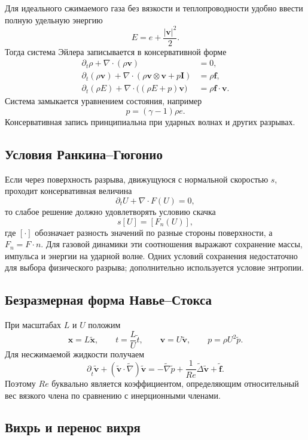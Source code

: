 Для идеального сжимаемого газа без вязкости и теплопроводности удобно ввести
полную удельную энергию
\[
    E=e+\frac{|\mathbf v|^2}{2}.
\]
Тогда система Эйлера записывается в консервативной форме
\[
\boxed{
\begin{aligned}
\partial_t\rho+\nabla\cdot(\rho\mathbf v)&=0,\\
\partial_t(\rho\mathbf v)
+\nabla\cdot(\rho\mathbf v\otimes\mathbf v+p\mathbf I)&=\rho\mathbf f,\\
\partial_t(\rho E)
+\nabla\cdot\bigl((\rho E+p)\mathbf v\bigr)&=\rho\mathbf f\cdot\mathbf v.
\end{aligned}}
\]
Система замыкается уравнением состояния, например
\[
    p=(\gamma-1)\rho e.
\]
Консервативная запись принципиальна при ударных волнах и других разрывах.

\subsection{Условия Ранкина--Гюгонио}

Если через поверхность разрыва, движущуюся с нормальной скоростью $s$, проходит
консервативная величина
\[
    \partial_t U+\nabla\cdot F(U)=0,
\]
то слабое решение должно удовлетворять условию скачка
\[
    \boxed{s[U]=[F_n(U)]},
\]
где $[\cdot]$ обозначает разность значений по разные стороны поверхности, а
$F_n=F\cdot n$. Для газовой динамики эти соотношения выражают сохранение массы,
импульса и энергии на ударной волне. Одних условий сохранения недостаточно для
выбора физического разрыва; дополнительно используется условие энтропии.

\subsection{Безразмерная форма Навье--Стокса}

При масштабах $L$ и $U$ положим
\[
    \mathbf x=L\widetilde{\mathbf x},
    \qquad
    t=\frac{L}{U}\widetilde t,
    \qquad
    \mathbf v=U\widetilde{\mathbf v},
    \qquad
    p=\rho U^2\widetilde p.
\]
Для несжимаемой жидкости получаем
\[
    \boxed{
    \partial_{\widetilde t}\widetilde{\mathbf v}
    +(\widetilde{\mathbf v}\cdot\widetilde\nabla)\widetilde{\mathbf v}
    =-\widetilde\nabla\widetilde p
    +\frac1{Re}\widetilde\Delta\widetilde{\mathbf v}
    +\widetilde{\mathbf f}.
    }
\]
Поэтому $Re$ буквально является коэффициентом, определяющим относительный вес
вязкого члена по сравнению с инерционными членами.

\subsection{Вихрь и перенос вихря}

